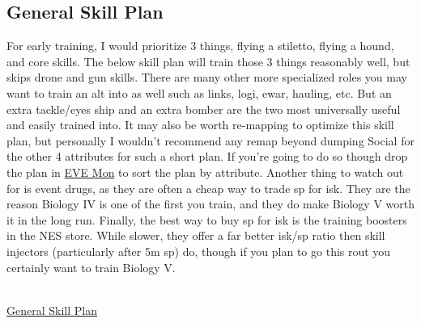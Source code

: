 \documentclass{article}
\begin{document}
\clearpage
\subsection{General Skill Plan} 
For early training, I would prioritize 3 things, flying a stiletto, flying a hound, and core skills. The below skill plan will train those 3 things
reasonably well, but skips drone and gun skills. There are many other more specialized roles you may want to train an alt into as well such as links,
logi, ewar, hauling, etc. But an extra tackle/eyes ship and an extra bomber are the two most universally useful and easily trained into. It may also be 
worth re-mapping to optimize this skill plan, but personally I wouldn't recommend any remap beyond dumping Social for the other 4 attributes for such a 
short plan. If you're going to do so though drop the plan in \href{https://evemondevteam.github.io/evemon/}{EVE Mon} to sort the plan by attribute.
Another thing to watch out for is event drugs, as they are often a cheap way to trade sp for isk. They are the reason Biology IV is one of the first 
you train, and they do make Biology V worth it in the long run. Finally, the best way to buy sp for isk is the training boosters in the NES store. While 
slower, they offer a far better isk/sp ratio then skill injectors (particularly after 5m sp) do, though if you plan to go this rout you certainly want to train Biology V.
\\
\\
\begin{center}  
\hyperref[generalSkillplan]{General Skill Plan}
\end{center}



\clearpage
\end{document}
